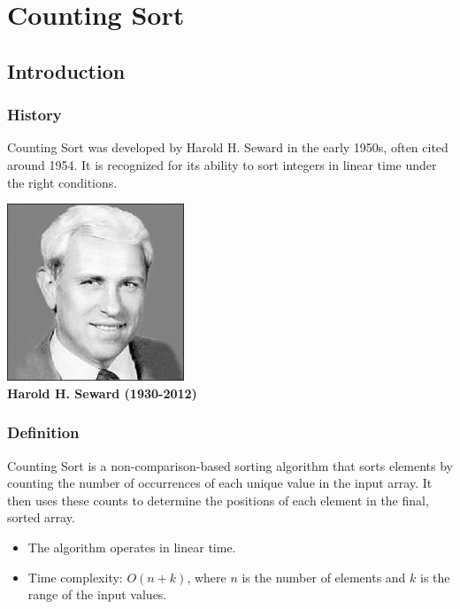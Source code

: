 \section{Counting Sort}

\subsection{Introduction}
\subsubsection{History}
Counting Sort was developed by Harold H. Seward in the early 1950s, often cited around 1954. It is recognized for its ability to sort integers in linear time under the right conditions.

\begin{center}
    \includegraphics[scale=1]{img/haroldHSeward.jpg} \\
    \textbf{Harold H. Seward (1930-2012)}
\end{center}

\subsubsection{Definition}
Counting Sort is a non-comparison-based sorting algorithm that sorts elements by counting the number of occurrences of each unique value in the input array. It then uses these counts to determine the positions of each element in the final, sorted array.

\begin{itemize}
    \item The algorithm operates in linear time.
    \item Time complexity: \(O(n + k)\), where \(n\) is the number of elements and \(k\) is the range of the input values.
\end{itemize}

